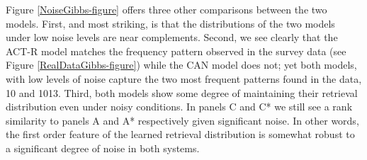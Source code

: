 \documentclass[10pt,letterpaper]{article}
\begin{document}
Figure \ref{NoiseGibbs-figure} offers three other comparisons between the two models. First, and most striking, is that the distributions of the two models under low noise levels are near complements. Second, we see clearly that the ACT-R model matches the frequency pattern observed in the survey data (see Figure \ref{RealDataGibbs-figure}) while the CAN model does not; yet both models, with low levels of noise capture the two most frequent patterns found in the data, 10 and 1013. Third, both models show some degree of maintaining their retrieval distribution even under noisy conditions. In panels C and C* we still see a rank similarity to panels A and A* respectively given significant noise. In other words, the first order feature of the learned retrieval distribution is somewhat robust to a significant degree of noise in both systems.
\end{document}
